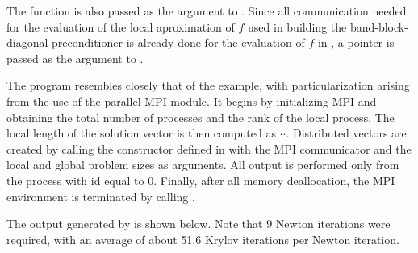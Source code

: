 The function  is also passed as the  argument to 
. Since all communication needed for the evaluation of the
local aproximation of $f$ used in building the band-block-diagonal preconditioner
is already done for the evaluation of $f$ in , a  pointer is
passed as the  argument to .

The  program resembles closely that of the  example, with
particularization arising from the use of the parallel MPI {\nvecp} module.
It begins by initializing MPI and obtaining the total number of processes and 
the rank of the local process. The local length of the solution vector is then 
computed as $\cdot$$\cdot$.
Distributed vectors are created by calling the constructor defined in {\nvecp}
with the MPI communicator and the local and global problem sizes as arguments.
All output is performed only from the process with id equal to $0$.
Finally, after all memory deallocation, the MPI environment is terminated by
calling .

The output generated by  is shown below.  Note that 9 Newton
iterations were required, with an average of about 51.6 Krylov iterations
per Newton iteration.



